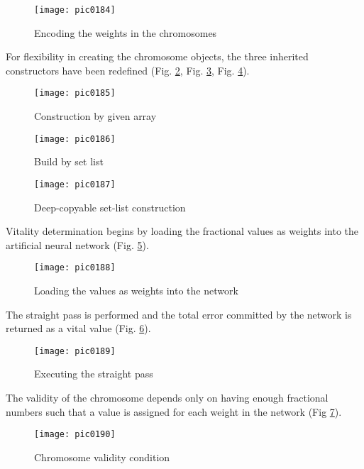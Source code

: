 \begin{figure}[h]
\centering
\texttt{[image: pic0184]}
\caption{Encoding the weights in the chromosomes}
\label{fig:pic0184}
\end{figure}
\FloatBarrier

For flexibility in creating the chromosome objects, the three inherited constructors have been redefined (Fig. \ref{fig:pic0185}, Fig. \ref{fig:pic0186}, Fig. \ref{fig:pic0187}).

\begin{figure}[h]
\centering
\texttt{[image: pic0185]}
\caption{Construction by given array}
\label{fig:pic0185}
\end{figure}
\FloatBarrier

\begin{figure}[h]
\centering
\texttt{[image: pic0186]}
\caption{Build by set list}
\label{fig:pic0186}
\end{figure}
\FloatBarrier

\begin{figure}[h]
\centering
\texttt{[image: pic0187]}
\caption{Deep-copyable set-list construction}
\label{fig:pic0187}
\end{figure}
\FloatBarrier

Vitality determination begins by loading the fractional values as weights into the artificial neural network (Fig. \ref{fig:pic0188}).

\begin{figure}[h]
\centering
\texttt{[image: pic0188]}
\caption{Loading the values as weights into the network}
\label{fig:pic0188}
\end{figure}
\FloatBarrier

The straight pass is performed and the total error committed by the network is returned as a vital value (Fig. \ref{fig:pic0189}).

\begin{figure}[h]
\centering
\texttt{[image: pic0189]}
\caption{Executing the straight pass}
\label{fig:pic0189}
\end{figure}
\FloatBarrier

The validity of the chromosome depends only on having enough fractional numbers such that a value is assigned for each weight in the network (Fig \ref{fig:pic0190}).

\begin{figure}[h]
\centering
\texttt{[image: pic0190]}
\caption{Chromosome validity condition}
\label{fig:pic0190}
\end{figure}
\FloatBarrier

